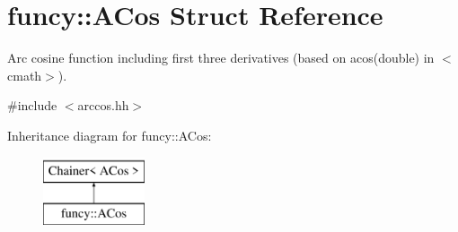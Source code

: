 \hypertarget{structfuncy_1_1ACos}{\section{funcy\-:\-:A\-Cos Struct Reference}
\label{structfuncy_1_1ACos}
}


Arc cosine function including first three derivatives (based on acos(double) in $<$cmath$>$).  




{\ttfamily \#include $<$arccos.\-hh$>$}

Inheritance diagram for funcy\-:\-:A\-Cos\-:\begin{figure}[H]
\begin{center}
\leavevmode
\includegraphics[height=2.000000cm]{structfuncy_1_1ACos}
\end{center}
\end{figure}
